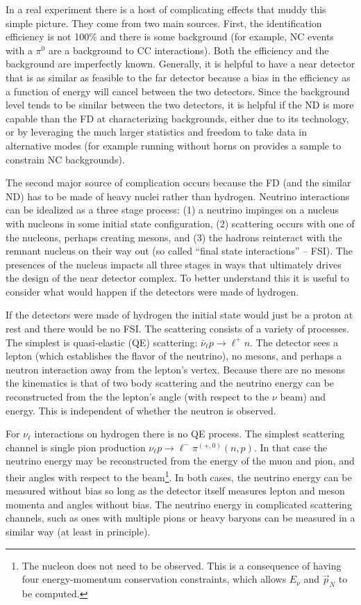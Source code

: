 In a real experiment there is a host of complicating effects that muddy this simple picture. They come from two main sources. First, the identification efficiency is not 100\% and there is some background (for example, NC events with a $\pi^0$ are a background to \nue CC interactions). Both the efficiency and the background are imperfectly known. Generally, it is helpful to have a near detector that is as similar as feasible to the far detector because a bias in the efficiency as a function of energy will cancel between the two detectors. Since the background level tends to be similar between the two detectors, it is helpful if the ND is more capable than the FD at characterizing backgrounds, either due to its technology, or by leveraging the much larger statistics and freedom to take data in alternative modes (for example running without horns on provides a sample to constrain NC backgrounds).

The second major source of complication occurs because the FD (and the similar ND) has to be made of heavy nuclei rather than hydrogen. Neutrino interactions can be idealized as a three stage process: (1) a neutrino impinges on a nucleus with nucleons in some initial state configuration, (2) scattering occurs with one of the nucleons, perhaps creating mesons, and (3) the hadrons reinteract with the remnant nucleus on their way out (so called ``final state interactions'' -- FSI). The presences of the nucleus impacts all three stages in ways that ultimately drives the design of the near detector complex. To better understand this it is useful to consider what would happen if the detectors were made of hydrogen.


If the detectors were made of hydrogen the initial state would just be a proton at rest and there would be no FSI. The scattering consists of a variety of processes. The simplest is quasi-elastic (QE) scattering: $\bar{\nu}_\ell p \to \ell^+ n$. The detector sees a lepton (which establishes the flavor of the neutrino), no mesons, and perhaps a neutron interaction away from the lepton's vertex. Because there are no mesons the kinematics is that of two body scattering and the neutrino energy can be reconstructed from the the lepton's angle (with respect to the $\nu$ beam) and energy. This is independent of whether the neutron is observed.

For $\nu_\ell$ interactions on hydrogen there is no QE process. The simplest scattering channel is single pion production $\nu_\ell p \to \ell^- \pi^{(+,0)} (n,p)$. In that case the neutrino energy may be reconstructed from the energy of the muon and pion, and their angles with respect to the beam\footnote{The nucleon does not need to be observed. This is a consequence of having four energy-momentum conservation constraints, which allows $E_\nu$ and $\vec{p}_N$ to be computed.}. In both cases, the neutrino energy can be measured without bias so long as the detector itself measures lepton and meson momenta and angles without bias.  The neutrino energy in complicated scattering channels, such as ones with multiple pions or heavy baryons can be measured in a similar way (at least in principle).

